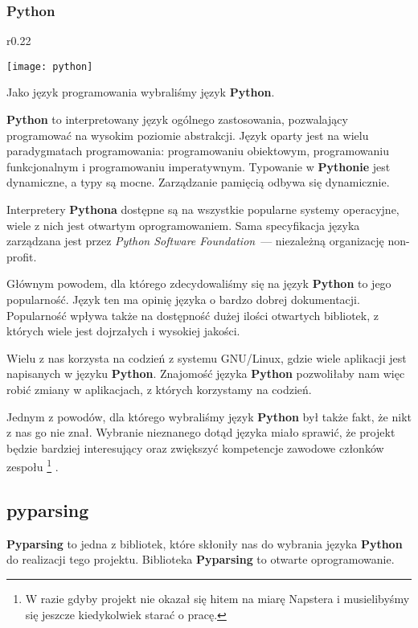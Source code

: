 \subsubsection{Python}

\begin{wrapfigure}{r}{0.22\textwidth}
  \begin{center}
    \texttt{[image: python]}
  \end{center}
\end{wrapfigure}
Jako język programowania wybraliśmy język \textbf{Python}.

\textbf{Python} to interpretowany język ogólnego zastosowania, pozwalający programować na wysokim poziomie abstrakcji.
Język oparty jest na wielu paradygmatach programowania: programowaniu obiektowym, programowaniu funkcjonalnym i programowaniu imperatywnym.
Typowanie w \textbf{Pythonie} jest dynamiczne, a typy są mocne.
Zarządzanie pamięcią odbywa się dynamicznie.

Interpretery \textbf{Pythona} dostępne są na wszystkie popularne systemy operacyjne, wiele z nich jest otwartym oprogramowaniem.
Sama specyfikacja języka zarządzana jest przez \emph{Python Software Foundation}~--- niezależną organizację non-profit.

Głównym powodem, dla którego zdecydowaliśmy się na język \textbf{Python} to jego popularność.
Język ten ma opinię języka o bardzo dobrej dokumentacji.
Popularność wpływa także na dostępność dużej ilości otwartych bibliotek, z których wiele jest dojrzałych i wysokiej jakości.

Wielu z nas korzysta na codzień z systemu GNU/Linux, gdzie wiele aplikacji jest napisanych w języku \textbf{Python}.
Znajomość języka \textbf{Python} pozwoliłaby nam więc robić zmiany w aplikacjach, z których korzystamy na codzień.

Jednym z powodów, dla którego wybraliśmy język \textbf{Python} był także fakt, że nikt z nas go nie znał.
Wybranie nieznanego dotąd języka miało sprawić, że projekt będzie bardziej interesujący oraz zwiększyć kompetencje zawodowe członków zespołu
\footnote{W razie gdyby projekt nie okazał się hitem na miarę Napstera i musielibyśmy się jeszcze kiedykolwiek starać o pracę.}
.

\subsection{pyparsing}
\textbf{Pyparsing} to jedna z bibliotek, które skłoniły nas do wybrania języka \textbf{Python} do realizacji tego projektu.
Biblioteka \textbf{Pyparsing} to otwarte oprogramowanie.

